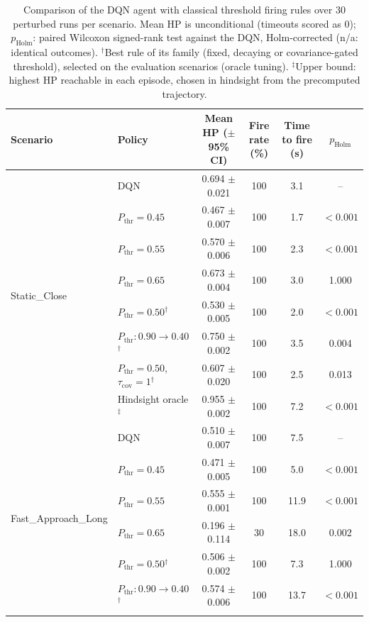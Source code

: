 \begin{table}[htbp]
\centering
\caption{Comparison of the DQN agent with classical threshold firing rules over 30 perturbed runs per scenario. Mean HP is unconditional (timeouts scored as 0); $p_{\mathrm{Holm}}$: paired Wilcoxon signed-rank test against the DQN, Holm-corrected (n/a: identical outcomes). $^{\dagger}$Best rule of its family (fixed, decaying or covariance-gated threshold), selected on the evaluation scenarios (oracle tuning). $^{\ddagger}$Upper bound: highest HP reachable in each episode, chosen in hindsight from the precomputed trajectory.}
\label{tab:comparison-traditional-rl}
\small
\begin{tabular}{llcccc}
\toprule
\textbf{Scenario} & \textbf{Policy} & \textbf{Mean HP ($\pm$95\% CI)} & \textbf{Fire rate (\%)} & \textbf{Time to fire (s)} & $p_{\mathrm{Holm}}$ \\
\midrule
\multirow{8}{*}{Static\_Close} & DQN & 0.694 $\pm$ 0.021 & 100 & 3.1 & -- \\
 & $P_{\mathrm{thr}}=0.45$ & 0.467 $\pm$ 0.007 & 100 & 1.7 & $<0.001$ \\
 & $P_{\mathrm{thr}}=0.55$ & 0.570 $\pm$ 0.006 & 100 & 2.3 & $<0.001$ \\
 & $P_{\mathrm{thr}}=0.65$ & 0.673 $\pm$ 0.004 & 100 & 3.0 & 1.000 \\
 & $P_{\mathrm{thr}}=0.50$$^{\dagger}$ & 0.530 $\pm$ 0.005 & 100 & 2.0 & $<0.001$ \\
 & $P_{\mathrm{thr}}: 0.90 \to 0.40$$^{\dagger}$ & 0.750 $\pm$ 0.002 & 100 & 3.5 & 0.004 \\
 & $P_{\mathrm{thr}}=0.50$, $\tau_{\mathrm{cov}}=1$$^{\dagger}$ & 0.607 $\pm$ 0.020 & 100 & 2.5 & 0.013 \\
 & Hindsight oracle$^{\ddagger}$ & 0.955 $\pm$ 0.002 & 100 & 7.2 & $<0.001$ \\
\midrule
\multirow{8}{*}{Fast\_Approach\_Long} & DQN & 0.510 $\pm$ 0.007 & 100 & 7.5 & -- \\
 & $P_{\mathrm{thr}}=0.45$ & 0.471 $\pm$ 0.005 & 100 & 5.0 & $<0.001$ \\
 & $P_{\mathrm{thr}}=0.55$ & 0.555 $\pm$ 0.001 & 100 & 11.9 & $<0.001$ \\
 & $P_{\mathrm{thr}}=0.65$ & 0.196 $\pm$ 0.114 & 30 & 18.0 & 0.002 \\
 & $P_{\mathrm{thr}}=0.50$$^{\dagger}$ & 0.506 $\pm$ 0.002 & 100 & 7.3 & 1.000 \\
 & $P_{\mathrm{thr}}: 0.90 \to 0.40$$^{\dagger}$ & 0.574 $\pm$ 0.006 & 100 & 13.7 & $<0.001$ \\
$$
\end{tabular}
\end{table}
